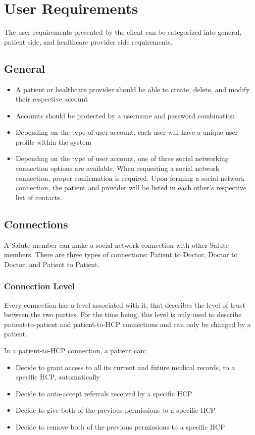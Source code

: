 \chapter{User Requirements}
The user requirements presented by the client can be categorized into general, patient side, and healthcare provider side requirements.

\section{General}
\begin{itemize}
\item A patient or healthcare provider should be able to create, delete, and modify their respective account
\item Accounts should be protected by a username and password combination
\item Depending on the type of user account, each user will have a unique user profile within the system
\item Depending on the type of user account, one of three social networking connection options are available. When requesting a social network connection, proper confirmation is required.  Upon forming a social network connection, the patient and provider will be listed in each other's respective list of contacts.
\end{itemize} 

\section{Connections}
A Salute member can make a social network connection with other Salute members. There are three types of connections: Patient to Doctor, Doctor to Doctor, and Patient to Patient. 

\subsection{Connection Level}
Every connection has a level associated with it, that describes the level of trust between the two parties. For the time being, this level is only used to describe patient-to-patient and patient-to-HCP connections and can only be changed by a patient.

In a patient-to-HCP connection, a patient can:
\begin{itemize}
\item Decide to grant access to all its current and future medical records, to a specific HCP, automatically
\item Decide to auto-accept referrals received by a specific HCP
\item Decide to give both of the previous permissions to a specific HCP
\item Decide to remove both of the previous permissions to a specific HCP
\end{itemize}

